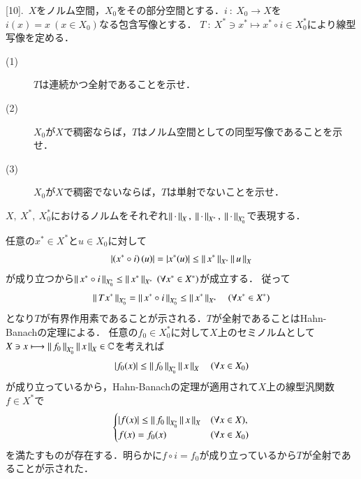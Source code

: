 [10].\ $X$をノルム空間，$X_0$をその部分空間とする．$i\ :\ X_0 \rightarrow X$を$i(x) = x\ (x \in X_0)$なる包含写像とする．
$T\ :\ X^* \ni x^* \longmapsto x^* \circ i \in X_0^*$により線型写像を定める．
\begin{description}
	\item[(1)] $T$は連続かつ全射であることを示せ．
	\item[(2)] $X_0$が$X$で稠密ならば，$T$はノルム空間としての同型写像であることを示せ．
	\item[(3)] $X_0$が$X$で稠密でないならば，$T$は単射でないことを示せ．
\end{description}

\begin{prf}
\begin{description} $X,\ X^*,\ X_0^*$におけるノルムをそれぞれ$\Norm{\cdot}{X},\ \Norm{\cdot}{X^*},\ \Norm{\cdot}{X_0^*}$で表現する．
	\item[(1)] 任意の$x^* \in X^*$と$u \in X_0$に対して
		\begin{align}
			\left|\left( x^* \circ i \right) (u)\right| = \left| x^*(u) \right| \leq \left\|\, x^*\, \right\|_{X^*} \left\|\, u\, \right\|_{X}
		\end{align}
		が成り立つから$\Norm{x^* \circ i}{X_0^*} \leq \Norm{x^*}{X^*}\ (\forall x^* \in X^*)$が成立する．
		従って
		\begin{align}
			\left\|\, Tx^*\, \right\|_{X_0^*} = \left\|\, x^* \circ i\, \right\|_{X_0^*} \leq \left\|\, x^*\, \right\|_{X^*} \quad \left(\forall x^* \in X^*\right)
		\end{align}
		となり$T$が有界作用素であることが示される．$T$が全射であることはHahn-Banachの定理による．
		任意の$f_0 \in X_0^*$に対して$X$上のセミノルムとして$X \ni x \longmapsto \left\|\, f_0\, \right\|_{X_0^*}\left\|\, x\, \right\|_{X} \in \mathbb{C}$を考えれば
		\begin{align}
			|f_0 (x)| \leq  \left\|\, f_0\, \right\|_{X_0^*}\left\|\, x\, \right\|_{X}\quad (\forall x \in X_0)
		\end{align}
		が成り立っているから，Hahn-Banachの定理が適用されて$X$上の線型汎関数$f \in X^*$で
		\begin{align}
			\begin{cases}
				|f (x)| \leq  \left\|\, f_0\, \right\|_{X_0^*}\left\|\, x\, \right\|_{X} & (\forall x \in X), \\
				f(x) = f_0(x) & (\forall x \in X_0)
			\end{cases}
		\end{align}
		を満たすものが存在する．明らかに$f \circ i = f_0$が成り立っているから$T$が全射であることが示された．
	

\end{description}
\end{prf}
